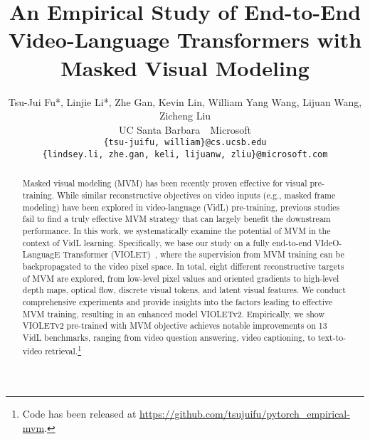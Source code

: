 \documentclass[10pt,twocolumn,letterpaper]{article}
\newcommand{\modelname}{VIOLETv2\xspace}
\newcommand{\modelorig}{VIOLET\xspace}
\begin{document}
\title{An Empirical Study of End-to-End \\ Video-Language Transformers with Masked Visual Modeling}
\author{Tsu-Jui Fu*, Linjie Li*, Zhe Gan, Kevin Lin, William Yang Wang, Lijuan Wang, Zicheng Liu\\UC Santa Barbara~~Microsoft\\{\tt \small \{tsu-juifu, william\}@cs.ucsb.edu}\\{\tt \small \{lindsey.li, zhe.gan, keli, lijuanw, zliu\}@microsoft.com}}
\maketitle


\begin{abstract}
Masked visual modeling (MVM) has been recently proven effective for visual pre-training. While similar reconstructive objectives on video inputs (e.g., masked frame modeling) have been explored in video-language (VidL) pre-training,  previous studies fail to find a truly effective MVM strategy that can largely benefit the downstream performance.
In this work, we systematically examine the potential of MVM in the context of VidL learning. Specifically, we base our study on a fully end-to-end VIdeO-LanguagE Transformer (\modelorig)~\cite{fu2021violet}, where the supervision from MVM training can be backpropagated to the  video pixel space. 
In total, eight different reconstructive targets of MVM are explored, from low-level pixel values and oriented gradients to high-level depth maps, optical flow, discrete visual tokens, and latent visual features. We conduct comprehensive experiments and provide insights into the factors leading to effective MVM training, resulting in an enhanced model \modelname. Empirically, we show \modelname pre-trained with MVM objective achieves notable improvements on 13 VidL benchmarks, ranging from video question answering, video captioning, to text-to-video retrieval.\footnote{Code has been released at \url{https://github.com/tsujuifu/pytorch_empirical-mvm}.}
\end{abstract}
\end{document}
